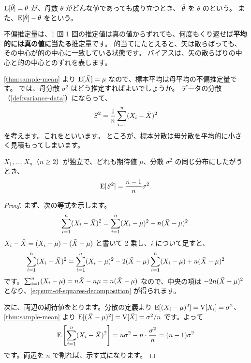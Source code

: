 \begin{definition}
  $\mathrm{E}[\hat{\theta}] = \theta$ が、母数 $\theta$ がどんな値であっても成り立つとき、
  $\hat{\theta}$ を $\theta$ のという。
  また、$\mathrm{E}[\hat{\theta}] - \theta$ をという。
\end{definition}

\begin{intuition}
  不偏推定量は、1 回 1 回の推定値は真の値からずれても、何度もくり返せば\textbf{平均的には真の値に当たる}推定量です。
  的当てにたとえると、矢は散らばっても、その中心が的の中心に一致している状態です。
  バイアスは、矢の散らばりの中心と的の中心とのずれを表します。
\end{intuition}

\cref{thm:sample-mean} より $\mathrm{E}[\bar{X}] = \mu$ なので、標本平均は母平均の不偏推定量です。
では、母分散 $\sigma^2$ はどう推定すればよいでしょうか。
データの分散（\cref{def:variance-data}）にならって、
\[
  S^2 = \frac{1}{n} \sum_{i=1}^{n} (X_i - \bar{X})^2
\]
を考えます。これをといいます。
ところが、標本分散は母分散を平均的に小さく見積もってしまいます。

\begin{theorem}
  $X_1, \dots, X_n$（$n \ge 2$）が独立で、どれも期待値 $\mu$、分散 $\sigma^2$ の同じ分布にしたがうとき、
  \[
    \mathrm{E}[S^2] = \frac{n-1}{n} \sigma^2.
  \]
\end{theorem}

\begin{proof}
  まず、次の等式を示します。
  \begin{equation}
    \sum_{i=1}^{n} (X_i - \bar{X})^2 = \sum_{i=1}^{n} (X_i - \mu)^2 - n(\bar{X} - \mu)^2.
    \label{eq:sum-of-squares-decomposition}
  \end{equation}
  $X_i - \bar{X} = (X_i - \mu) - (\bar{X} - \mu)$ と書いて 2 乗し、$i$ について足すと、
  \[
    \sum_{i=1}^{n} (X_i - \bar{X})^2 = \sum_{i=1}^{n} (X_i - \mu)^2 - 2(\bar{X} - \mu) \sum_{i=1}^{n} (X_i - \mu) + n(\bar{X} - \mu)^2
  \]
  です。$\sum_{i=1}^{n} (X_i - \mu) = n\bar{X} - n\mu = n(\bar{X} - \mu)$ なので、中央の項は $-2n(\bar{X} - \mu)^2$ となり、\cref{eq:sum-of-squares-decomposition} が得られます。

  次に、両辺の期待値をとります。分散の定義より $\mathrm{E}[(X_i - \mu)^2] = \mathrm{V}[X_i] = \sigma^2$、
  \cref{thm:sample-mean} より $\mathrm{E}[(\bar{X} - \mu)^2] = \mathrm{V}[\bar{X}] = \sigma^2/n$ です。よって
  \[
    \mathrm{E}\left[\sum_{i=1}^{n} (X_i - \bar{X})^2\right] = n\sigma^2 - n \cdot \frac{\sigma^2}{n} = (n - 1)\sigma^2
  \]
  です。両辺を $n$ で割れば、示す式になります。
\end{proof}

